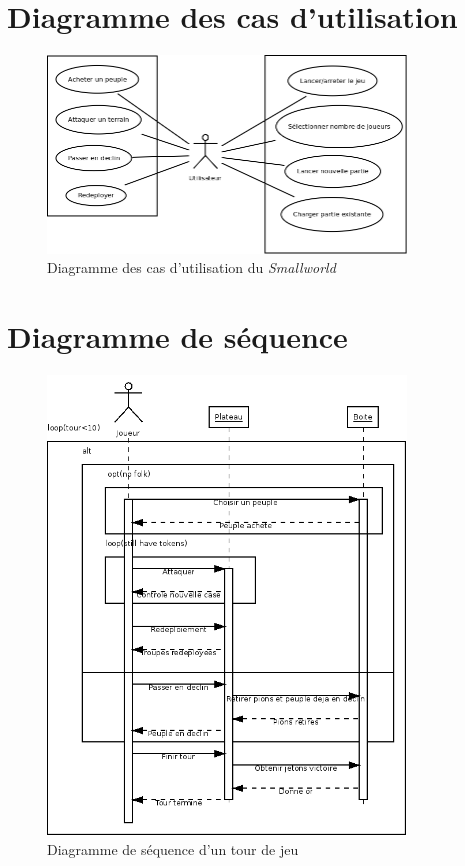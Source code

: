 \documentclass[a4paper]{report}
\begin{document}
\section{Diagramme des cas d'utilisation}
\begin{figure}[H]
    \begin{center}
        \includegraphics[width=0.85\textwidth]{use_case.png}
        \caption{Diagramme des cas d'utilisation du \textit{Smallworld}}
    \end{center}
\end{figure}
\section{Diagramme de séquence}
\begin{figure}[H]
    \begin{center}
        \includegraphics[width=0.85\textwidth]{sequence.png}
        \caption{Diagramme de séquence d'un tour de jeu}
    \end{center}
\end{figure}
\end{document}
